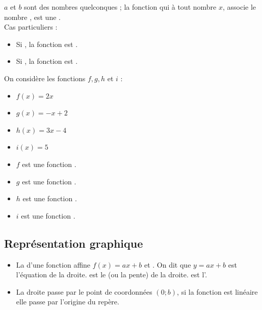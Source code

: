 \documentclass[12pt,a4paper]{article}
\begin{document}
	\begin{mydef}
		
		$a$ et $b$ sont des nombres quelconques ; la fonction qui à tout nombre $x$, associe le nombre , est une .\\
		
		
		Cas particuliers :
		\begin{itemize}
			\item Si , la fonction est .
			\item Si , la fonction est .
		\end{itemize}
	\end{mydef}
	
	\begin{myexs}
		On considère les fonctions $f,g,h$ et $i$ :
		\begin{multicols}{2}
			\begin{itemize}
				\item $f(x)=2x$
				\item $g(x)=-x+2$
				\item $h(x)=3x-4$
				\item $i(x)=5$
			\end{itemize}
		\end{multicols}
		
		\begin{itemize}
			\item $f$ est une fonction .
			\item $g$ est une fonction .
			\item $h$ est une fonction .
			\item $i$ est une fonction .
		\end{itemize}
	\end{myexs}
	
	\subsection{Représentation graphique}

	\begin{myprops}
		\begin{itemize}
			\item La  d'une fonction affine $f(x)=ax+b$ et . On dit que $y=ax+b$ est l'équation de la droite.
			 est le  (ou la pente) de la droite.
			 est l'.
			\item La droite passe par le point de coordonnées $(0;b)$, si la fonction est linéaire elle passe par l'origine du repère.
		\end{itemize}
		
	\end{myprops}
	
\end{document}
